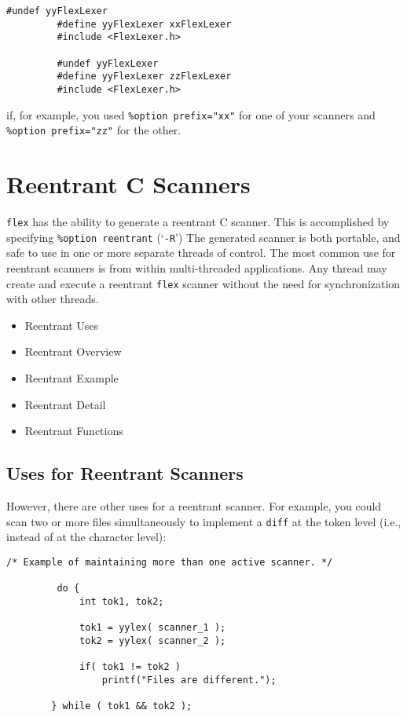 \documentclass[openany,oneside]{book}
\begin{document}
\begin{verbatim}
#undef yyFlexLexer
         #define yyFlexLexer xxFlexLexer
         #include <FlexLexer.h>
     
         #undef yyFlexLexer
         #define yyFlexLexer zzFlexLexer
         #include <FlexLexer.h>
\end{verbatim}


if, for example, you used \verb`%option prefix="xx"` for one of your
scanners and \verb`%option prefix="zz"` for the other.
\chapter{Reentrant C Scanners}


 \verb`flex` has the ability to generate a reentrant C scanner. This is
accomplished by specifying \verb`%option reentrant` (‘\verb`-R`’) The generated
scanner is both portable, and safe to use in one or more separate threads of
control.  The most common use for reentrant scanners is from within
multi-threaded applications.  Any thread may create and execute a reentrant \verb`flex` scanner without the need for synchronization with other threads.
\begin{itemize}
\item Reentrant Uses
\item Reentrant Overview
\item Reentrant Example
\item Reentrant Detail
\item Reentrant Functions
\end{itemize}

\section{Uses for Reentrant Scanners}


However, there are other uses for a reentrant scanner.  For example, you
could scan two or more files simultaneously to implement a \verb`diff` at
the token level (i.e., instead of at the character level):


\begin{verbatim}
/* Example of maintaining more than one active scanner. */
     
         do {
             int tok1, tok2;
     
             tok1 = yylex( scanner_1 );
             tok2 = yylex( scanner_2 );
     
             if( tok1 != tok2 )
                 printf("Files are different.");
     
        } while ( tok1 && tok2 );
\end{verbatim}
\end{document}
